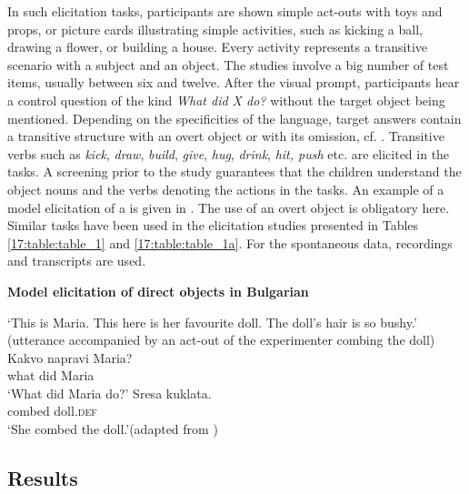 \documentclass[output=paper,modfonts,newtxmath,hidelinks,]{langscibook}
\begin{document}
\noindent In such elicitation tasks, participants are shown simple act-outs with toys and props, or picture cards illustrating simple activities, such as kicking a ball, drawing a flower, or building a house. Every activity represents a transitive scenario with a subject and an object. The studies involve a big number of test items, usually between six and twelve. After the visual prompt, participants hear a control question of the kind \textit{What did X do?} without the target object being mentioned. Depending on the specificities of the language, target answers contain a transitive structure with an overt object or with its omission, cf. . Transitive verbs such as \textit{kick}, \textit{draw}, \textit{build}, \textit{give}, \textit{hug}, \textit{drink}, \textit{hit, push} etc. are elicited in the tasks. A screening prior to the study guarantees that the children understand the object nouns and the verbs denoting the actions in the tasks. An example of a model elicitation of a  is given in . The use of an overt object is obligatory here. Similar tasks have been used in the elicitation studies presented in Tables \ref{17:table:table_1} and \ref{17:table:table_1a}. For the spontaneous data, recordings and transcripts are used.\largerpage[-2]

\ea \textbf{Model elicitation of direct objects in Bulgarian}\label{17:ex5}
\begin{exe}
\exi{}   `This is Maria. This here is her favourite doll. The doll’s hair is so bushy.' (utterance accompanied by an act-out of the experimenter combing the doll)
\exi{}	\gll Kakvo napravi Maria?\\
     	what did Maria\\
		\glt ‘What did Maria do?’
\exi{}	\gll Sresa kuklata.\\
        combed doll.\textsc{def}\\
		\glt ‘She combed the doll.’\hfill (adapted from \citealt[79]{Radeva-Bork2012})
\end{exe}        
\z

\subsection{Results}\label{17:sec:key:3.2}
\end{document}
